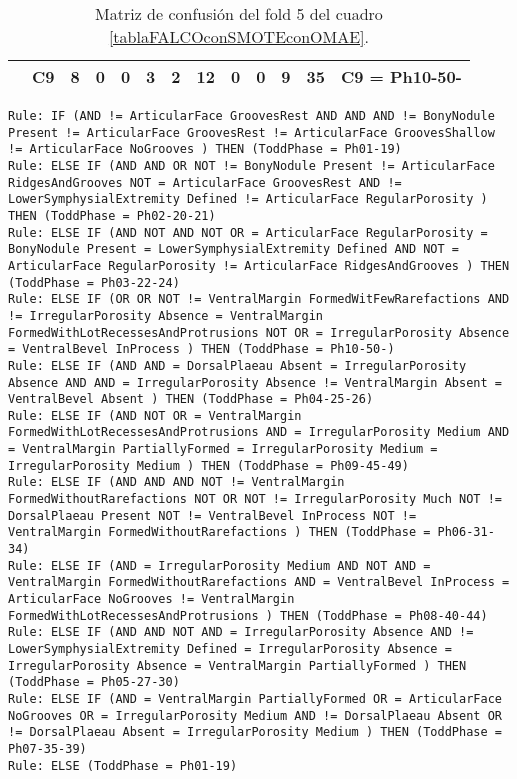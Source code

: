 \begin{table}[H]
{\begin{tabular}{|ccrrrrrrrrrrc|}
\multicolumn{1}{|c|}{}                                      & \multicolumn{1}{c|}{C9} & \multicolumn{1}{c|}{\textbf{8}}  & \multicolumn{1}{c|}{0}  & \multicolumn{1}{c|}{0}  & \multicolumn{1}{c|}{\textbf{3}}  & \multicolumn{1}{c|}{\textbf{2}}  & \multicolumn{1}{c|}{\textbf{12}} & \multicolumn{1}{c|}{0}  & \multicolumn{1}{c|}{0}  & \multicolumn{1}{c|}{\textbf{9}}  & \multicolumn{1}{c|}{\textbf{35}} & C9 = Ph10-50-     \\ \hline
\end{tabular}%
}
\caption{Matriz de confusión del fold 5 del cuadro \ref{tablaFALCOconSMOTEconOMAE}.}
\end{table}

\begin{lstlisting}
Rule: IF (AND != ArticularFace GroovesRest AND AND AND != BonyNodule Present != ArticularFace GroovesRest != ArticularFace GroovesShallow != ArticularFace NoGrooves ) THEN (ToddPhase = Ph01-19)
Rule: ELSE IF (AND AND OR NOT != BonyNodule Present != ArticularFace RidgesAndGrooves NOT = ArticularFace GroovesRest AND != LowerSymphysialExtremity Defined != ArticularFace RegularPorosity ) THEN (ToddPhase = Ph02-20-21)
Rule: ELSE IF (AND NOT AND NOT OR = ArticularFace RegularPorosity = BonyNodule Present = LowerSymphysialExtremity Defined AND NOT = ArticularFace RegularPorosity != ArticularFace RidgesAndGrooves ) THEN (ToddPhase = Ph03-22-24)
Rule: ELSE IF (OR OR NOT != VentralMargin FormedWitFewRarefactions AND != IrregularPorosity Absence = VentralMargin FormedWithLotRecessesAndProtrusions NOT OR = IrregularPorosity Absence = VentralBevel InProcess ) THEN (ToddPhase = Ph10-50-)
Rule: ELSE IF (AND AND = DorsalPlaeau Absent = IrregularPorosity Absence AND AND = IrregularPorosity Absence != VentralMargin Absent = VentralBevel Absent ) THEN (ToddPhase = Ph04-25-26)
Rule: ELSE IF (AND NOT OR = VentralMargin FormedWithLotRecessesAndProtrusions AND = IrregularPorosity Medium AND = VentralMargin PartiallyFormed = IrregularPorosity Medium = IrregularPorosity Medium ) THEN (ToddPhase = Ph09-45-49)
Rule: ELSE IF (AND AND AND NOT != VentralMargin FormedWithoutRarefactions NOT OR NOT != IrregularPorosity Much NOT != DorsalPlaeau Present NOT != VentralBevel InProcess NOT != VentralMargin FormedWithoutRarefactions ) THEN (ToddPhase = Ph06-31-34)
Rule: ELSE IF (AND = IrregularPorosity Medium AND NOT AND = VentralMargin FormedWithoutRarefactions AND = VentralBevel InProcess = ArticularFace NoGrooves != VentralMargin FormedWithLotRecessesAndProtrusions ) THEN (ToddPhase = Ph08-40-44)
Rule: ELSE IF (AND AND NOT AND = IrregularPorosity Absence AND != LowerSymphysialExtremity Defined = IrregularPorosity Absence = IrregularPorosity Absence = VentralMargin PartiallyFormed ) THEN (ToddPhase = Ph05-27-30)
Rule: ELSE IF (AND = VentralMargin PartiallyFormed OR = ArticularFace NoGrooves OR = IrregularPorosity Medium AND != DorsalPlaeau Absent OR != DorsalPlaeau Absent = IrregularPorosity Medium ) THEN (ToddPhase = Ph07-35-39)
Rule: ELSE (ToddPhase = Ph01-19)
\end{lstlisting}


